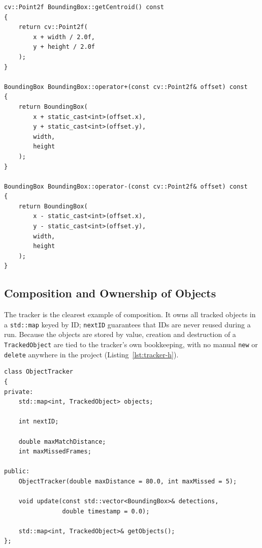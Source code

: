 \documentclass[12pt,a4paper,oneside]{book}
\begin{document}
\begin{minipage}{\linewidth}
\begin{lstlisting}[caption={Overloaded \texttt{+} and \texttt{-} operators, and the centroid computation.}, label={lst:operators}]
cv::Point2f BoundingBox::getCentroid() const
{
    return cv::Point2f(
        x + width / 2.0f,
        y + height / 2.0f
    );
}

BoundingBox BoundingBox::operator+(const cv::Point2f& offset) const
{
    return BoundingBox(
        x + static_cast<int>(offset.x),
        y + static_cast<int>(offset.y),
        width,
        height
    );
}

BoundingBox BoundingBox::operator-(const cv::Point2f& offset) const
{
    return BoundingBox(
        x - static_cast<int>(offset.x),
        y - static_cast<int>(offset.y),
        width,
        height
    );
}
\end{lstlisting}
\end{minipage}

\subsection{Composition and Ownership of Objects}
The tracker is the clearest example of composition. It owns all tracked objects in a \texttt{std::map} keyed by ID; \texttt{nextID} guarantees that IDs are never reused during a run. Because the objects are stored by value, creation and destruction of a \texttt{TrackedObject} are tied to the tracker's own bookkeeping, with no manual \texttt{new} or \texttt{delete} anywhere in the project (Listing~\ref{lst:tracker-h}).

\begin{minipage}{\linewidth}
\begin{lstlisting}[caption={\texttt{Tracker.h}: \texttt{ObjectTracker} owns its \texttt{TrackedObject}s.}, label={lst:tracker-h}]
class ObjectTracker
{
private:
    std::map<int, TrackedObject> objects;

    int nextID;

    double maxMatchDistance;
    int maxMissedFrames;

public:
    ObjectTracker(double maxDistance = 80.0, int maxMissed = 5);

    void update(const std::vector<BoundingBox>& detections,
                double timestamp = 0.0);

    std::map<int, TrackedObject>& getObjects();
};
\end{lstlisting}
\end{minipage}
\end{document}
